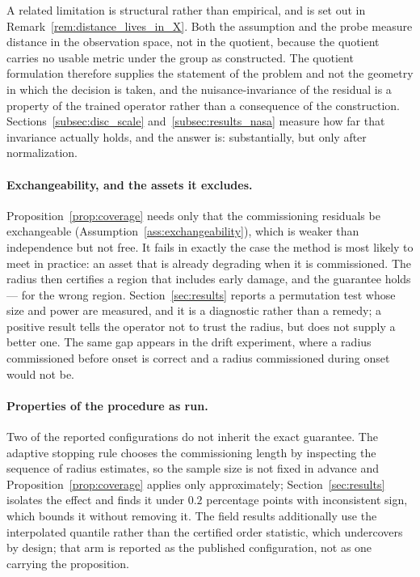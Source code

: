 \documentclass[a4paper]{cas-sc}
\begin{document}
A related limitation is structural rather than empirical, and is set out in
Remark~\ref{rem:distance_lives_in_X}. Both the assumption and the probe measure
distance in the observation space, not in the quotient, because the quotient
carries no usable metric under the group as constructed. The quotient
formulation therefore supplies the statement of the problem and not the
geometry in which the decision is taken, and the nuisance-invariance of the
residual is a property of the trained operator rather than a consequence of
the construction. Sections~\ref{subsec:disc_scale}
and~\ref{subsec:results_nasa} measure how far that invariance actually holds,
and the answer is: substantially, but only after normalization.

\paragraph{Exchangeability, and the assets it excludes.}
Proposition~\ref{prop:coverage} needs only that the commissioning residuals be
exchangeable (Assumption~\ref{ass:exchangeability}), which is weaker than
independence but not free. It fails in exactly the case the method is most
likely to meet in practice: an asset that is already degrading when it is
commissioned. The radius then certifies a region that includes early damage,
and the guarantee holds --- for the wrong region. Section~\ref{sec:results}
reports a permutation test whose size and power are measured, and it is a
diagnostic rather than a remedy; a positive result tells the operator not to
trust the radius, but does not supply a better one. The same gap appears in
the drift experiment, where a radius commissioned before onset is correct and a
radius commissioned during onset would not be.

\paragraph{Properties of the procedure as run.}
Two of the reported configurations do not inherit the exact guarantee. The
adaptive stopping rule chooses the commissioning length by inspecting the
sequence of radius estimates, so the sample size is not fixed in advance and
Proposition~\ref{prop:coverage} applies only approximately;
Section~\ref{sec:results} isolates the effect and finds it under \(0.2\)
percentage points with inconsistent sign, which bounds it without removing it.
The field results additionally use the interpolated quantile rather than the
certified order statistic, which undercovers by design; that arm is reported
as the published configuration, not as one carrying the proposition.
\end{document}
